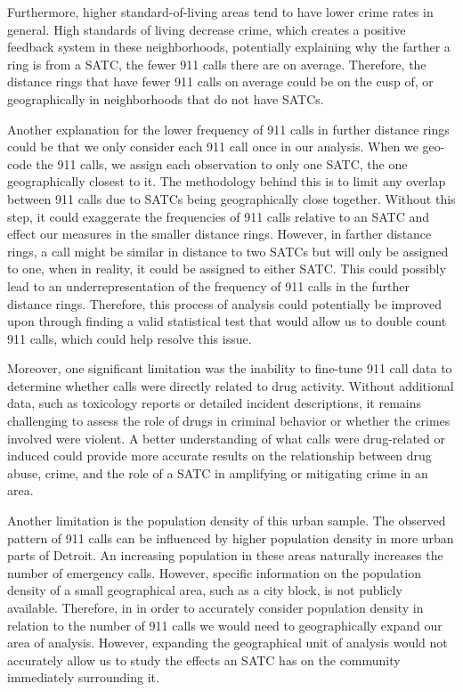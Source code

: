 \documentclass[12pt]{article}
\begin{document}
Furthermore, higher standard-of-living areas tend to have lower crime rates in general. High standards of living decrease crime, which creates a positive feedback system in these neighborhoods, potentially explaining why the farther a ring is from a SATC, the fewer 911 calls there are on average. Therefore, the distance rings that have fewer 911 calls on average could be on the cusp of, or geographically in neighborhoods that do not have SATCs. 
    
Another explanation for the lower frequency of 911 calls in further distance rings could be that we only consider each 911 call once in our analysis. When we geo-code the 911 calls, we assign each observation to only one SATC, the one geographically closest to it. The methodology behind this is to limit any overlap between 911 calls due to SATCs being geographically close together. Without this step, it could exaggerate the frequencies of 911 calls relative to an SATC and effect our measures in the smaller distance rings.  However, in farther distance rings, a call might be similar in distance to two SATCs but will only be assigned to one, when in reality, it could be assigned to either SATC. This could possibly lead to an underrepresentation of the frequency of 911 calls in the further distance rings. Therefore, this process of analysis could potentially be improved upon through finding a valid statistical test that would allow us to double count 911 calls, which could help resolve this issue. 

Moreover, one significant limitation was the inability to fine-tune 911 call data to determine whether calls were directly related to drug activity. Without additional data, such as toxicology reports or detailed incident descriptions, it remains challenging to assess the role of drugs in criminal behavior or whether the crimes involved were violent. A better understanding of what calls were drug-related or induced could provide more accurate results on the relationship between drug abuse, crime, and the role of a SATC in amplifying or mitigating crime in an area. 
    
Another limitation is the population density of this urban sample. The observed pattern of 911 calls can be influenced by higher population density in more urban parts of Detroit. An increasing population in these areas naturally increases the number of emergency calls. However, specific information on the population density of a small geographical area, such as a city block, is not publicly available. Therefore, in in order to accurately consider population density in relation to the number of 911 calls we would need to geographically expand our area of analysis. However, expanding the geographical unit of analysis would not accurately allow us to study the effects an SATC has on the community immediately surrounding it. 
\end{document}
